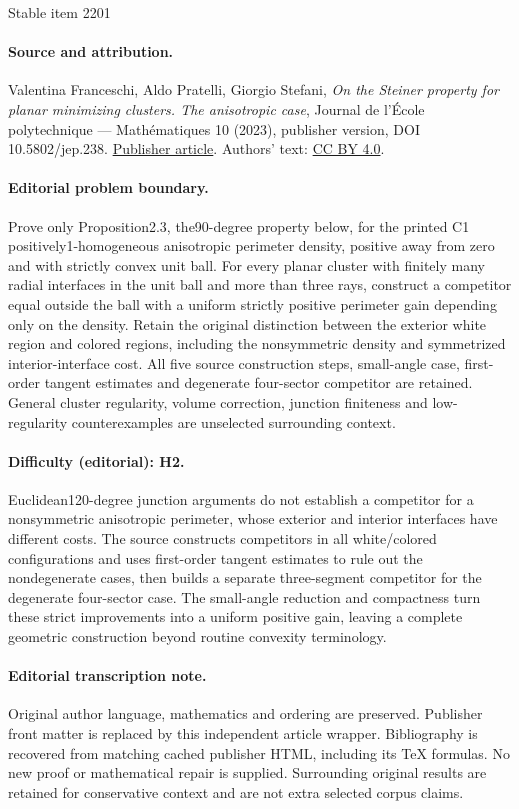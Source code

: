 \documentclass[11pt]{article}
\numberwithin{equation}{section}
\theoremstyle{plain}
\theoremstyle{definition}
\begin{document}
\begin{center}{\Large Stable item 2201}\end{center}
\paragraph{Source and attribution.}
Valentina Franceschi, Aldo Pratelli, Giorgio Stefani, \emph{On the Steiner property for planar minimizing clusters. The anisotropic case}, Journal de l’École polytechnique — Mathématiques 10 (2023), publisher version, DOI 10.5802/jep.238. \href{https://jep.centre-mersenne.org/articles/10.5802/jep.238/}{Publisher article}. Authors' text: \href{https://creativecommons.org/licenses/by/4.0/}{CC BY 4.0}.
\paragraph{Editorial problem boundary.}
Prove only Proposition2.3, the90-degree property below, for the printed C1 positively1-homogeneous anisotropic perimeter density, positive away from zero and with strictly convex unit ball. For every planar cluster with finitely many radial interfaces in the unit ball and more than three rays, construct a competitor equal outside the ball with a uniform strictly positive perimeter gain depending only on the density. Retain the original distinction between the exterior white region and colored regions, including the nonsymmetric density and symmetrized interior-interface cost. All five source construction steps, small-angle case, first-order tangent estimates and degenerate four-sector competitor are retained. General cluster regularity, volume correction, junction finiteness and low-regularity counterexamples are unselected surrounding context.
\paragraph{Difficulty (editorial): H2.}
Euclidean120-degree junction arguments do not establish a competitor for a nonsymmetric anisotropic perimeter, whose exterior and interior interfaces have different costs. The source constructs competitors in all white/colored configurations and uses first-order tangent estimates to rule out the nondegenerate cases, then builds a separate three-segment competitor for the degenerate four-sector case. The small-angle reduction and compactness turn these strict improvements into a uniform positive gain, leaving a complete geometric construction beyond routine convexity terminology.
\paragraph{Editorial transcription note.}
Original author language, mathematics and ordering are preserved. Publisher front matter is replaced by this independent article wrapper. Bibliography is recovered from matching cached publisher HTML, including its TeX formulas. No new proof or mathematical repair is supplied. Surrounding original results are retained for conservative context and are not extra selected corpus claims.
\clearpage
\end{document}
